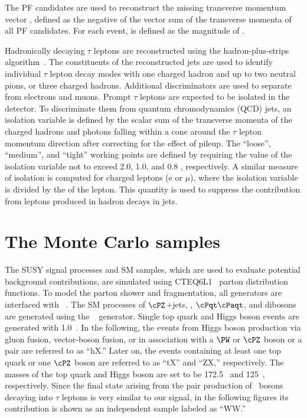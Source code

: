 The PF candidates are used to reconstruct the missing transverse momentum  vector \ptvecmiss, 
defined as the negative of the vector sum of the transverse momenta of all PF candidates.  
For each event, \MPT is defined as the magnitude of \ptvecmiss.

Hadronically decaying $\tau$ leptons are reconstructed using the hadron-plus-strips algorithm~\cite{Khachatryan:2015dfa}.
The constituents of the reconstructed jets are used to identify individual $\tau$ lepton decay modes with one charged 
hadron and up to two neutral pions, or three charged hadrons. 
Additional discriminators are used to separate \Tau from electrons and muons.
Prompt $\tau$ leptons are expected to be isolated in the detector.
To discriminate them from quantum chromodynamics (QCD) jets,
an isolation variable \cite{Khachatryan:2014wca} is defined by the scalar sum of the transverse momenta of the charged hadrons 
and photons falling within 
a cone around the $\tau$ lepton momentum direction after correcting for the effect of
pileup. The ``loose'', ``medium'', and ``tight'' working points are defined
by requiring the value of the isolation variable not to exceed 2.0, 1.0,
and 0.8 \GeV, respectively.
A similar measure of isolation is computed for charged leptons (e or $\mu$), 
where the isolation variable is divided by the \PT of the lepton. This quantity is 
used to suppress the contribution from leptons produced in hadron decays in jets.

\section{The Monte Carlo samples}
\label{sect:MCSamples}
The SUSY signal processes and SM samples, which are used to evaluate potential background contributions, 
are simulated using CTEQ6L1~\cite{Nadolsky:2008zw} parton distribution functions. 
To model the parton shower and fragmentation, all generators are interfaced with ~\cite{Sjostrand:2006za}.
The SM processes of $\cPZ$+jets, \wjets, $\cPqt\cPaqt$, and dibosons are generated using the ~\cite{Alwall:2011uj} generator. 
Single top quark and Higgs boson events are generated with {\POWHEG} 1.0~\cite{Nason:2004rx,Frixione:2007vw,Alioli:2009je,Alioli:2010xd}.
In the following, the events from Higgs boson production via gluon fusion, vector-boson fusion, or in association with a $\PW$ or $\cPZ$  boson 
or a \ttbar pair are referred to as ``hX.'' Later on, 
the events containing at least one top quark or one $\cPZ$ boson are referred to as ``tX'' and ``ZX,'' respectively. 
The masses of the top quark and Higgs boson are set to be 172.5\GeV~\cite{Khachatryan:2015hba} and 125\GeV~\cite{Aad:2015zhl}, respectively. Since the 
final state arising from the pair production of \PW~bosons decaying into $\tau$ leptons is very similar 
to our signal, in the following figures its contribution is shown as an independent sample labeled as ``WW.''

